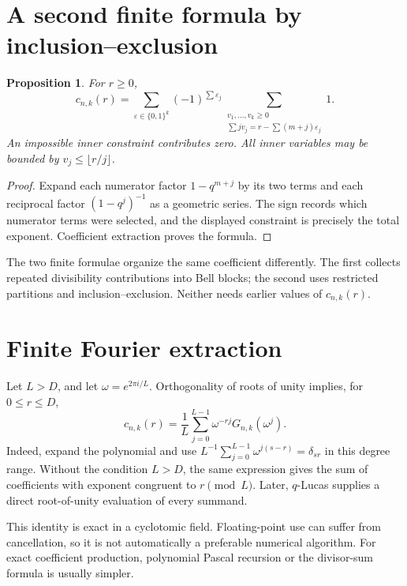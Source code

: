 \documentclass[11pt,a4paper,oneside,openany]{book}
\newtheorem{proposition}[theorem]{Proposition}
\theoremstyle{definition}
\theoremstyle{remark}
\begin{document}
\section{A second finite formula by inclusion--exclusion}
\begin{proposition}\label{qcc:coefficient-inclusion}
For \(r\ge0\),
\begin{equation}\label{qcc:coefficient-inclusion-formula}
 c_{n,k}(r)=\sum_{\varepsilon\in\{0,1\}^k}(-1)^{\sum\varepsilon_j}
 \sum_{\substack{v_1,\ldots,v_k\ge0\\
       \sum jv_j=r-\sum(m+j)\varepsilon_j}}1.
\end{equation}
An impossible inner constraint contributes zero. All inner variables may be
bounded by \(v_j\le\lfloor r/j\rfloor\).
\end{proposition}
\begin{proof}
Expand each numerator factor \(1-q^{m+j}\) by its two terms and each reciprocal
factor \((1-q^j)^{-1}\) as a geometric series. The sign records which numerator
terms were selected, and the displayed constraint is precisely the total
exponent. Coefficient extraction proves the formula.
\end{proof}
The two finite formulae organize the same coefficient differently. The first
collects repeated divisibility contributions into Bell blocks; the second uses
restricted partitions and inclusion--exclusion. Neither needs earlier values of
\(c_{n,k}(r)\).

\section{Finite Fourier extraction}
Let \(L>D\), and let \(\omega=e^{2\pi i/L}\). Orthogonality of roots of unity
implies, for \(0\le r\le D\),
\begin{equation}\label{qcc:fourier-coefficient}
 c_{n,k}(r)=\frac1L\sum_{j=0}^{L-1}\omega^{-rj}G_{n,k}(\omega^j).
\end{equation}
Indeed, expand the polynomial and use
\(L^{-1}\sum_{j=0}^{L-1}\omega^{j(s-r)}=\delta_{sr}\) in this degree range.
Without the condition \(L>D\), the same expression gives the sum of coefficients
with exponent congruent to \(r\pmod L\). Later, \(q\)-Lucas supplies a direct
root-of-unity evaluation of every summand.

This identity is exact in a cyclotomic field. Floating-point use can suffer from
cancellation, so it is not automatically a preferable numerical algorithm. For
exact coefficient production, polynomial Pascal recursion or the divisor-sum
formula is usually simpler.
\end{document}

